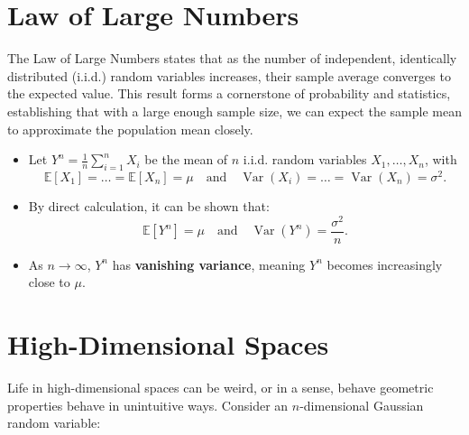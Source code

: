

\section{Law of Large Numbers}

The Law of Large Numbers states that as the number of independent, identically distributed (i.i.d.) random variables increases, their sample average converges to the expected value. This result forms a cornerstone of probability and statistics, establishing that with a large enough sample size, we can expect the sample mean to approximate the population mean closely.

\begin{itemize}
    \item Let \( Y^n = \frac{1}{n} \sum_{i=1}^n X_i \) be the mean of \(n\) i.i.d. random variables \( X_1, \dots, X_n \), with
          \[
              \mathbb{E}[X_1] = \dots = \mathbb{E}[X_n] = \mu \quad \text{and} \quad \operatorname{Var}(X_i) = \dots = \operatorname{Var}(X_n) = \sigma^2.
          \]

    \item By direct calculation, it can be shown that:
          \[
              \mathbb{E}[Y^n] = \mu \quad \text{and} \quad \operatorname{Var}(Y^n) = \frac{\sigma^2}{n}.
          \]

    \item As \( n \to \infty \), \( Y^n \) has \textbf{vanishing variance}, meaning \( Y^n \) becomes increasingly close to \( \mu \).
\end{itemize}


\section{High-Dimensional Spaces}

Life in high-dimensional spaces can be weird, or in a sense, behave geometric properties behave in unintuitive ways. Consider an $n$-dimensional Gaussian random variable:

